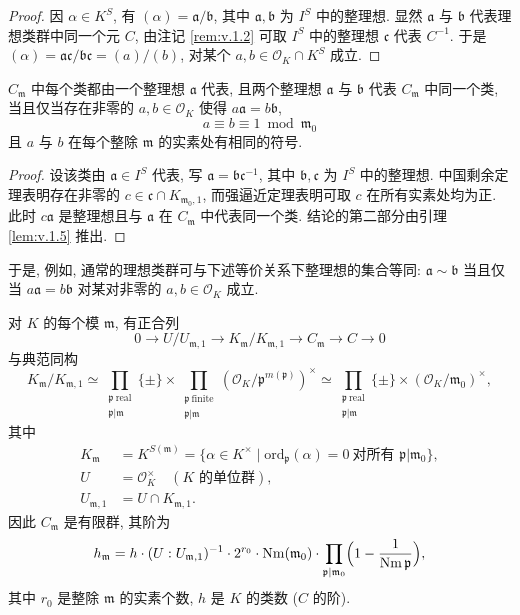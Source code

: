 \begin{proof}
因 $\alpha\in K^S$, 有 $(\alpha)=\mathfrak{a}/\mathfrak{b}$, 其中 $\mathfrak{a},\mathfrak{b}$ 为 $I^S$ 中的整理想. 显然 $\mathfrak{a}$ 与 $\mathfrak{b}$ 代表理想类群中同一个元 $C$, 由注记 \ref{rem:v.1.2} 可取 $I^S$ 中的整理想 $\mathfrak{c}$ 代表 $C^{-1}$. 于是 $(\alpha)=\mathfrak{ac}/\mathfrak{bc}=(a)/(b)$, 对某个 $a,b\in\mathcal{O}_K\cap K^S$ 成立.
\end{proof}

\begin{proposition}\label{prop:v.1.6}
$C_{\mathfrak{m}}$ 中每个类都由一个整理想 $\mathfrak{a}$ 代表, 且两个整理想 $\mathfrak{a}$ 与 $\mathfrak{b}$ 代表 $C_{\mathfrak{m}}$ 中同一个类, 当且仅当存在非零的 $a,b\in\mathcal{O}_K$ 使得 $a\mathfrak{a}=b\mathfrak{b}$,
\[
a\equiv b\equiv 1\bmod\mathfrak{m}_0
\]
且 $a$ 与 $b$ 在每个整除 $\mathfrak{m}$ 的实素处有相同的符号.
\end{proposition}

\begin{proof}
设该类由 $\mathfrak{a}\in I^S$ 代表, 写 $\mathfrak{a}=\mathfrak{b}\mathfrak{c}^{-1}$, 其中 $\mathfrak{b},\mathfrak{c}$ 为 $I^S$ 中的整理想. 中国剩余定理表明存在非零的 $c\in\mathfrak{c}\cap K_{\mathfrak{m}_0,1}$, 而强逼近定理表明可取 $c$ 在所有实素处均为正. 此时 $c\mathfrak{a}$ 是整理想且与 $\mathfrak{a}$ 在 $C_{\mathfrak{m}}$ 中代表同一个类. 结论的第二部分由引理 \ref{lem:v.1.5} 推出.
\end{proof}

于是, 例如, 通常的理想类群可与下述等价关系下整理想的集合等同: $\mathfrak{a}\sim\mathfrak{b}$ 当且仅当 $a\mathfrak{a}=b\mathfrak{b}$ 对某对非零的 $a,b\in\mathcal{O}_K$ 成立.

\begin{theorem}\label{thm:v.1.7}
对 $K$ 的每个模 $\mathfrak{m}$, 有正合列
\[
0\to U/U_{\mathfrak{m},1}\to K_{\mathfrak{m}}/K_{\mathfrak{m},1}\to C_{\mathfrak{m}}\to C\to0
\]
与典范同构
\[
K_{\mathfrak{m}}/K_{\mathfrak{m},1}\simeq\prod_{\substack{\mathfrak{p}\ \mathrm{real}\\ \mathfrak{p}|\mathfrak{m}}}\{\pm\}\times\prod_{\substack{\mathfrak{p}\ \mathrm{finite}\\ \mathfrak{p}|\mathfrak{m}}}(\mathcal{O}_K/\mathfrak{p}^{m(\mathfrak{p})})^{\times}
\simeq\prod_{\substack{\mathfrak{p}\ \mathrm{real}\\ \mathfrak{p}|\mathfrak{m}}}\{\pm\}\times(\mathcal{O}_K/\mathfrak{m}_0)^{\times},
\]
其中
\begin{align*}
K_{\mathfrak{m}}&=K^{S(\mathfrak{m})}=\{\alpha\in K^{\times}\mid \mathrm{ord}_{\mathfrak{p}}(\alpha)=0\ \text{对所有 }\mathfrak{p}|\mathfrak{m}_0\},\\
U&=\mathcal{O}_K^{\times}\quad(\text{$K$ 的单位群}),\\
U_{\mathfrak{m},1}&=U\cap K_{\mathfrak{m},1}.
\end{align*}
因此 $C_{\mathfrak{m}}$ 是有限群, 其阶为
\[
h_{\mathfrak{m}}=h\cdot(U:U_{\mathfrak{m},1})^{-1}\cdot 2^{r_0}\cdot\operatorname{Nm}(\mathfrak{m}_0)\cdot\prod_{\mathfrak{p}|\mathfrak{m}_0}\Bigl(1-\frac{1}{\operatorname{Nm}\mathfrak{p}}\Bigr),
\]
其中 $r_0$ 是整除 $\mathfrak{m}$ 的实素个数, $h$ 是 $K$ 的类数 ($C$ 的阶).
\end{theorem}

